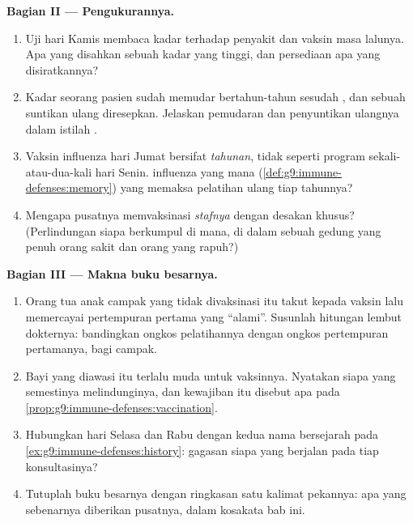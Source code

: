 \begin{problem}
\medskip\noindent\textbf{Bagian II --- Pengukurannya.}
\begin{enumerate}[resume]
  \item Uji hari Kamis membaca kadar  terhadap
        penyakit dan vaksin masa lalunya. Apa yang disahkan
        sebuah kadar yang tinggi, dan persediaan  apa yang
        disiratkannya?
  \item Kadar seorang pasien sudah memudar bertahun-tahun
        sesudah , dan sebuah suntikan ulang
        diresepkan. Jelaskan pemudaran dan penyuntikan
        ulangnya dalam istilah .
  \item Vaksin influenza hari Jumat bersifat \emph{tahunan},
        tidak seperti program sekali-atau-dua-kali hari
        Senin.   influenza yang mana
        (\cref{def:g9:immune-defenses:memory}) yang memaksa
        pelatihan ulang tiap tahunnya?
  \item Mengapa pusatnya memvaksinasi \emph{stafnya} dengan
        desakan khusus? (Perlindungan siapa berkumpul di
        mana, di dalam sebuah gedung yang penuh orang sakit
        dan orang yang rapuh?)
\end{enumerate}

\medskip\noindent\textbf{Bagian III --- Makna buku
besarnya.}
\begin{enumerate}[resume]
  \item Orang tua anak campak yang tidak divaksinasi itu
        takut kepada vaksin lalu memercayai pertempuran
        pertama yang ``alami''. Susunlah hitungan lembut
        dokternya: bandingkan ongkos pelatihannya dengan
        ongkos pertempuran pertamanya, bagi campak.
  \item Bayi yang diawasi itu terlalu muda untuk vaksinnya.
        Nyatakan siapa yang semestinya melindunginya, dan
        kewajiban itu disebut apa pada
        \cref{prop:g9:immune-defenses:vaccination}.
  \item Hubungkan hari Selasa dan Rabu dengan kedua nama
        bersejarah pada \cref{ex:g9:immune-defenses:history}:
        gagasan siapa yang berjalan pada tiap konsultasinya?
  \item Tutuplah buku besarnya dengan ringkasan satu kalimat
        pekannya: apa yang sebenarnya diberikan pusatnya,
        dalam kosakata bab ini.
\end{enumerate}
\end{problem}
